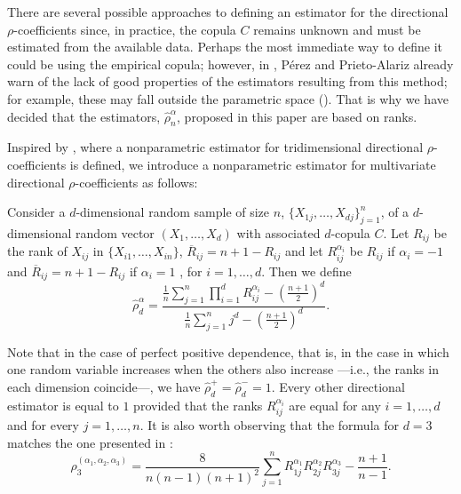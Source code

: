 \documentclass[11pt,a4paper]{article}
\begin{document}
There are several possible approaches to defining an estimator for the directional $\rho$-coefficients since, in practice, the copula $C$ remains unknown and must be estimated from the available data. Perhaps the most immediate way to define it could be using the empirical copula; however, in \cite{Pe2016}, Pérez and Prieto-Alariz already warn of the lack of good properties of the estimators resulting from this method; for example, these may fall outside the parametric space (\cite[Example 1]{Pe2016}). That is why we have decided that the estimators, $\widehat{\rho}_n^\alpha$, proposed in this paper are based on ranks.

Inspired by \cite{Gar2013}, where a nonparametric estimator for tridimensional directional $\rho$-coefficients is defined, we introduce a nonparametric estimator for multivariate directional $\rho$-coefficients as follows:

Consider a $d$-dimensional random sample of size $n$, $\{X_{1j},\ldots,X_{dj}\}_{j=1}^n$, of a $d$-dimensional random vector $(X_1,\ldots,X_d)$ with associated $d$-copula $C$. Let $R_{ij}$ be the rank of $X_{ij}$ in $\{X_{i1},\ldots,X_{in}\}$, $\overline{R}_{ij}=n+1-R_{ij}$ and let $R_{ij}^{\alpha_i}$ be $R_{ij}$ if $\alpha_i=-1$ and $\overline{R}_{ij}=n+1-R_{ij}$ if $\alpha_i=1$ , for $i=1,\ldots,d$. Then we define
$$\widehat{\rho}_d^{\alpha}=\frac{\frac{1}{n}\sum_{j=1}^n\prod_{i=1}^dR_{ij}^{\alpha_i}-\left(\frac{n+1}{2}\right)^d}{\frac{1}{n}\sum_{j=1}^nj^d-\left(\frac{n+1}{2}\right)^d}.$$

Note that in the case of perfect positive dependence, that is, in the case in which one random variable increases when the others also increase ---i.e., the ranks in each dimension coincide---, we have $\widehat{\rho}_d^+=\widehat{\rho}_d^-=1$. Every other directional estimator is equal to $1$ provided that the ranks $R_{ij}^{\alpha_i}$ are equal for any $i=1,\ldots,d$ and for every $j=1,\ldots,n$. It is also worth observing that the formula for $d=3$ matches the one presented in \cite {Gar2013}:
$$\widehat{\rho}_3^{(\alpha_1,\alpha_2,\alpha_3)}=\frac{8}{n(n-1)(n+1)^2}\sum_{j=1}^nR_{1j}^{\alpha_1}R_{2j}^{\alpha_2}R_{3j}^{\alpha_3}-\frac{n+1}{n-1}.$$
\end{document}
